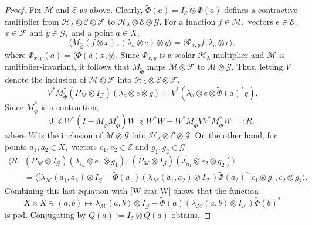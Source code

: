 \documentclass[a4paper,reqno,index]{amsart}
\numberwithin{equation}{section}
\newcommand{\cM}{\mathcal{M}}
\newcommand{\cH}{\mathcal{H}}
\newcommand{\HSF}{\mathcal{F}}
\newcommand{\HSE}{\mathcal{E}}
\newcommand{\HSG}{\mathcal{G}}
\newcommand{\genl}{\lambda} %
\theoremstyle{definition}
\begin{document}
 

\begin{proof}
Fix $\mathcal{M}$ and $\mathcal{E}$ as above. Clearly, $\widetilde{\Phi}(a)=I_{\mathcal{E}}\otimes \Phi(a)$ defines a contractive multiplier from $\mathcal{H}_{\genl}\otimes\mathcal{E}\otimes\mathcal{F}$ to $\mathcal{H}_{\genl}\otimes\mathcal{E}\otimes\mathcal{G}$. 
For a function $f\in \cM,$ vectors $e\in \HSE$, $x\in \mathcal{F}$
and $y\in \mathcal{G},$ and a point $a\in X,$
\[
  \langle  M_{\widetilde{\Phi}} (f \otimes x), (\genl_a\otimes e)\otimes y \rangle 
   = \langle \Phi_{x,y} f, \genl_a\otimes e \rangle,
\]
 where $\Phi_{x,y}(a)= \langle \Phi(a)x,y\rangle.$ 
 Since $\Phi_{x,y}$ is a scalar $\mathcal{H}_{\genl}$-multiplier
 and $\cM$ is multiplier-invariant, 
 it follows that $M_{\widetilde{\Phi}}$ maps $\cM\otimes \HSF$
 to $\cM\otimes \mathcal{G}.$  Thus, letting $V$ denote the inclusion of $\cM\otimes \HSF$
 into $\cH_\genl\otimes \HSE\otimes \HSF,$
\[
  V^* M_{\widetilde{\Phi}}^* (P_{\cM}\otimes I_\HSG) (\genl_a\otimes e\otimes g)
   = V^* (\genl_a \otimes e\otimes \widetilde{\Phi}(a)^* g).
\]
Since $M_{\widetilde{\Phi}}^*$ is a contraction, 
\begin{equation}
\label{W-star-W}
  0  \preceq  W^*(I-M_{\widetilde{\Phi}} M_{\widetilde{\Phi}}^*) W
\preceq W^*W - W^* M_{\widetilde{\Phi}} VV^* M_{\widetilde{\Phi}}^*W
=:R,
\end{equation}
 where $W$ is the inclusion of $\cM\otimes\HSG$ into $\cH_\genl\otimes \HSE\otimes \HSG$.
On the other hand,  for points $a_1,a_2\in X,$ vectors $e_1,e_2\in \HSE$
  and $g_1,g_2\in \HSG$  
\begin{equation*}
    \label{preW-star-W}
\begin{split}
      \langle R & (P_{\cM} \otimes I_\HSG )(\genl_{a_2}\otimes e_1\otimes g_1), \, (P_{\cM} \otimes I_\HSG)  (\genl_{a_1}\otimes e_2\otimes g_2)  \rangle 
\\ & =  \bigg \langle \big [\genl_{\mathcal{M}}(a_1,a_2)\otimes I_{\mathcal{G}}-\widetilde{\Phi}(a_1)(\genl_{\mathcal{M}}(a_1,a_2)\otimes I_{\mathcal{F}})\widetilde{\Phi}(a_2)^*  
\big ] e_1\otimes g_1,e_2\otimes g_2 \bigg \rangle.
\end{split}
\end{equation*}
 Combining this last equation with
 \eqref{W-star-W}   shows
 that the function
\[
 X\times X \ni (a,b) \mapsto 
 \genl_{\mathcal{M}}(a, b)\otimes I_{\mathcal{G}}-\widetilde{\Phi}(a)(\genl_{\mathcal{M}}(a, b)\otimes I_{\mathcal{F}})\widetilde{\Phi}(b)^*
\]
 is psd.   
Conjugating by $\widetilde{Q}(a):= I_{\mathcal{E}}\otimes Q(a)$ obtains,

\end{proof}
\end{document}
